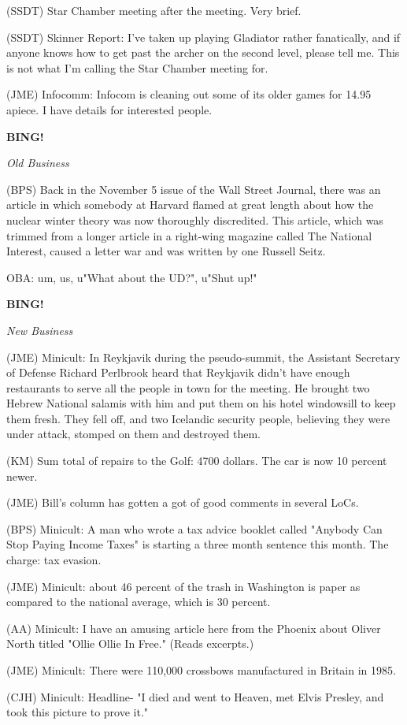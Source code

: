 \documentclass[12pt]{article}
\newcommand{\bing}{{\bf BING!} }
\newcommand{\goto}[1]{\bing \vskip 12pt \centerline{{\em{#1}}}}
\begin{document}
(SSDT) Star Chamber meeting after the meeting. Very brief.

(SSDT) Skinner Report: I've taken up playing Gladiator rather fanatically, and if anyone knows how to get past the archer on the second level, please tell me. This is not what I'm calling the Star Chamber meeting for.

(JME) Infocomm: Infocom is cleaning out some of its older games for 14.95 apiece. I have details for interested people.

\goto{Old Business}

(BPS) Back in the November 5 issue of the Wall Street Journal, there was an article in which somebody at Harvard flamed at great length about how the nuclear winter theory was now thoroughly discredited. This article, which was trimmed from a longer article in a right-wing magazine called The National Interest, caused a letter war and was written by one Russell Seitz.

OBA: um, us, u"What about the UD?", u"Shut up!"

\goto{New Business}

(JME) Minicult: In Reykjavik during the pseudo-summit, the Assistant Secretary of Defense Richard Perlbrook heard that Reykjavik didn't have enough restaurants to serve all the people in town for the meeting. He brought two Hebrew National salamis with him and put them on his hotel windowsill to keep them fresh. They fell off, and two Icelandic security people, believing they were under attack, stomped on them and destroyed them.

(KM) Sum total of repairs to the Golf: 4700 dollars. The car is now 10 percent newer.

(JME) Bill's column has gotten a got of good comments in several LoCs.

(BPS) Minicult: A man who wrote a tax advice booklet called "Anybody Can Stop Paying Income Taxes" is starting a three month sentence this month. The charge: tax evasion.

(JME) Minicult: about 46 percent of the trash in Washington is paper as compared to the national average, which is 30 percent.

(AA) Minicult: I have an amusing article here from the Phoenix about Oliver North titled "Ollie Ollie In Free." (Reads excerpts.)

(JME) Minicult: There were 110,000 crossbows manufactured in Britain in 1985.

(CJH) Minicult: Headline- "I died and went to Heaven, met Elvis Presley, and took this picture to prove it."
\end{document}
